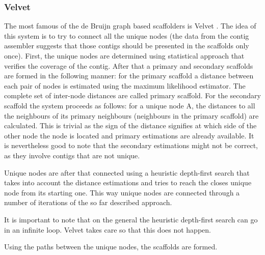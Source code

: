 \documentclass[11pt]{article}
\begin{document}

\subsubsection{Velvet} %
\label{ssub:Velvet}
The most famous of the de Bruijn graph based scaffolders is Velvet
\cite{velvet-scaffolding}. The idea of this system is to try to connect all the
unique nodes (the data from the contig assembler suggests that those contigs
should be presented in the scaffolds only once). First, the unique nodes are
determined using statistical approach that verifies the coverage of the contig.
After that a primary and secondary scaffolds are formed in the following manner:
for the primary scaffold a distance between each pair of nodes is estimated
using the maximum likelihood estimator. The complete set of inter-node distances
are called primary scaffold. For the secondary scaffold the system proceeds as
follows: for a unique node A, the distances to all the neighbours of its primary
neighbours (neighbours in the primary scaffold) are calculated. This is trivial
as the sign of the distance signifies at which side of the other node the node
is located and primary estimations are already available. It is nevertheless
good to note that the secondary estimations might not be correct, as they
involve contigs that are not unique.

Unique nodes are after that connected using a heuristic depth-first search that
takes into account the distance estimations and tries to reach the closes unique
node from its starting one. This way unique nodes are connected through a number
of iterations of the so far described approach.

It is important to note that on the general the heuristic depth-first search can
go in an infinite loop. Velvet takes care so that this does not happen.

Using the paths between the unique nodes, the scaffolds are formed.


\end{document}
